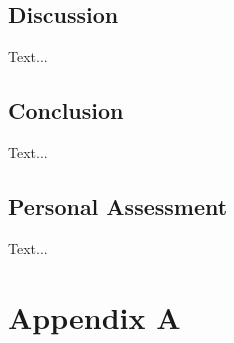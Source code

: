 \documentclass[12pt,a4paper]{report}
\begin{document}
\section{Discussion}
Text...

\section{Conclusion}
Text...

\section{Personal Assessment}
Text...

\printbibliography

\chapter{Appendix A}
\end{document}
